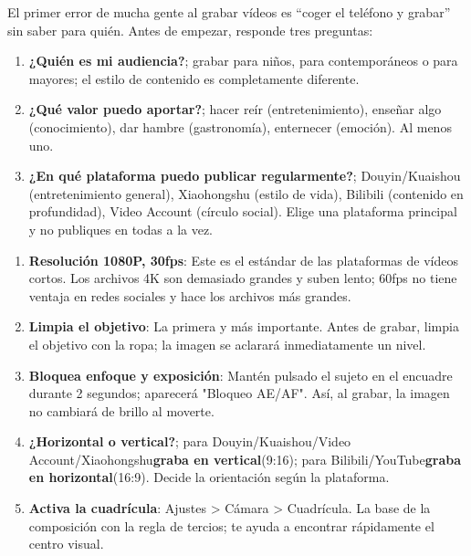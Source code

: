 


El primer error de mucha gente al grabar vídeos es “coger el teléfono y grabar” sin saber para quién. Antes de empezar, responde tres preguntas:

\begin{enumerate}
  \item \textbf{¿Quién es mi audiencia?}; grabar para niños, para contemporáneos o para mayores; el estilo de contenido es completamente diferente.
  \item \textbf{¿Qué valor puedo aportar?}; hacer reír (entretenimiento), enseñar algo (conocimiento), dar hambre (gastronomía), enternecer (emoción). Al menos uno.
  \item \textbf{¿En qué plataforma puedo publicar regularmente?}; Douyin/Kuaishou (entretenimiento general), Xiaohongshu (estilo de vida), Bilibili (contenido en profundidad), Video Account (círculo social). Elige una plataforma principal y no publiques en todas a la vez.
\end{enumerate}


\begin{enumerate}
  \item \textbf{Resolución 1080P, 30fps}: Este es el estándar de las plataformas de vídeos cortos. Los archivos 4K son demasiado grandes y suben lento; 60fps no tiene ventaja en redes sociales y hace los archivos más grandes.
  \item \textbf{Limpia el objetivo}: La primera y más importante. Antes de grabar, limpia el objetivo con la ropa; la imagen se aclarará inmediatamente un nivel.
  \item \textbf{Bloquea enfoque y exposición}: Mantén pulsado el sujeto en el encuadre durante 2 segundos; aparecerá "Bloqueo AE/AF". Así, al grabar, la imagen no cambiará de brillo al moverte.
  \item \textbf{¿Horizontal o vertical?}; para Douyin/Kuaishou/Video Account/Xiaohongshu\textbf{graba en vertical}(9:16); para Bilibili/YouTube\textbf{graba en horizontal}(16:9). Decide la orientación según la plataforma.
  \item \textbf{Activa la cuadrícula}: Ajustes > Cámara > Cuadrícula. La base de la composición con la regla de tercios; te ayuda a encontrar rápidamente el centro visual.
\end{enumerate}

